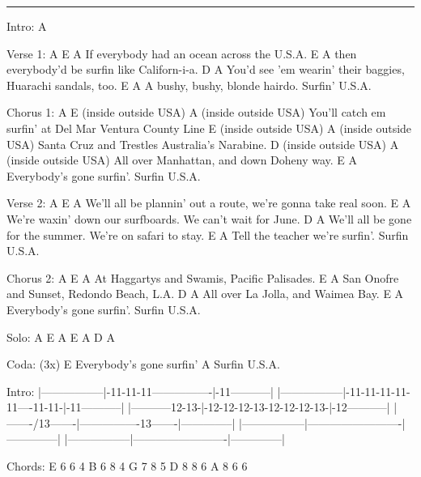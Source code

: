 \noindent\rule{\columnwidth}{1pt}

\begin{lstsong}
Intro: A

Verse 1:
A                   E                 A
If everybody had an ocean across the U.S.A.
                    E                    A
then everybody'd be surfin like Californ-i-a.
                            D                          A
You'd see 'em wearin' their baggies, Huarachi sandals, too.
                       E                   A
A bushy, bushy, blonde hairdo. Surfin' U.S.A.

Chorus 1:
A                          E (inside outside USA)             A (inside outside USA)
You'll catch em surfin' at Del Mar             Ventura County Line
               E (inside outside USA)                A (inside outside USA)                 
Santa Cruz and Trestles              Australia's Narabine.
            D (inside outside USA)               A (inside outside USA)
All over Manhattan,              and down Doheny way.
                 E                   A
Everybody's gone surfin'. Surfin U.S.A.

Verse 2:
A                           E                            A
We'll all be plannin' out a route, we're gonna take real soon.
                      E                             A
We're waxin' down our surfboards. We can't wait for June.
                          D                          A
We'll all be gone for the summer. We're on safari to stay.
                       E                   A
Tell the teacher we're surfin'. Surfin U.S.A.

Chorus 2:
A                E                    A
At Haggartys and Swamis,  Pacific Palisades.
                  E                     A
San Onofre and Sunset, Redondo Beach, L.A.
            D                 A
All over La Jolla, and Waimea Bay.
                 E                   A
Everybody's gone surfin'. Surfin U.S.A.

Solo: A E A E A D A

Coda: (3x)
                 E
Everybody's gone surfin' 
           A
Surfin U.S.A.
\end{lstsong}
\newpage

\begin{lsttab}
Intro:
|-----------------|-11-11-11----------------|-11-----------|
|-----------------|-11-11-11-11-11----11-11-|-11-----------|
|-----------12-13-|-12-12-12-13-12-12-12-13-|-12-----------|
|-------/13-------|----------------13-------|--------------|
|-----------------|-------------------------|--------------|
|-----------------|-------------------------|--------------|

Chords:
E  6   6   4
B  6   8   4
G  7   8   5
D  8   8   6
A  8   6   6
\end{lsttab}
\newpage


